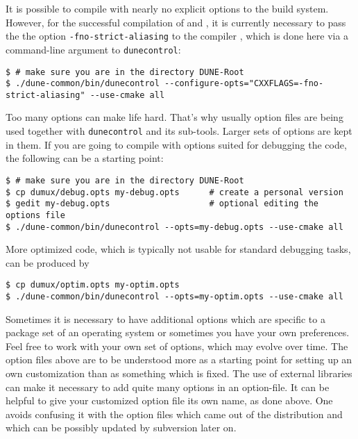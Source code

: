 It is possible to compile \Dumux with nearly no explicit options to the build system.
However, for the successful compilation of \Dune and \Dumux, it is currently necessary to pass the
the option \texttt{-fno-strict-aliasing} to the \Cplusplus compiler
\cite{WIKIPED-ALIASING}, which is done here via a command-line argument to \texttt{dunecontrol}:
\begin{lstlisting}[style=Bash]
$ # make sure you are in the directory DUNE-Root
$ ./dune-common/bin/dunecontrol --configure-opts="CXXFLAGS=-fno-strict-aliasing" --use-cmake all
\end{lstlisting}

Too many options can make life hard. That's why usually option files are being used together with \texttt{dunecontrol} and its sub-tools.
Larger sets of options are kept in them. If you are going to compile with options suited for debugging the code, the following
can be a starting point:
\begin{lstlisting}[style=Bash]
$ # make sure you are in the directory DUNE-Root
$ cp dumux/debug.opts my-debug.opts      # create a personal version
$ gedit my-debug.opts                    # optional editing the options file 
$ ./dune-common/bin/dunecontrol --opts=my-debug.opts --use-cmake all 
\end{lstlisting}

More optimized code, which is typically not usable for standard debugging tasks, can be produced by 
\begin{lstlisting}[style=Bash]
$ cp dumux/optim.opts my-optim.opts 
$ ./dune-common/bin/dunecontrol --opts=my-optim.opts --use-cmake all
\end{lstlisting}

Sometimes it is necessary to have additional options which
are specific to a package set of an operating system or
sometimes you have your own preferences.
Feel free to work with your own set of options, which may evolve over time.
The option files above are to be understood more as a starting point
for setting up an own customization than as something which is fixed.
The use of external libraries can make it necessary to add quite many options in an option-file.
It can be helpful to give your customized option file its own name, as done above.
One avoids confusing it with the option files which came out of the distribution
and which can be possibly updated by subversion later on.

